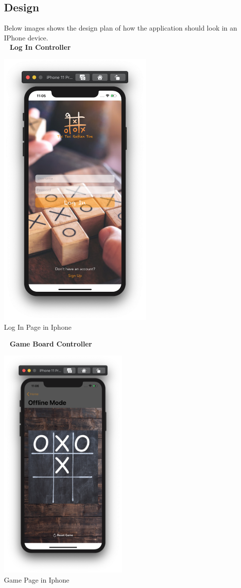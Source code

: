 \documentclass{scrartcl}
\begin{document}
    \subsection{Design}
        Below images shows the design plan of how the application should look in an IPhone device.\\
        ~\newline
        \textbf{Log In Controller}
        \begin{center}
        \includegraphics[width=3in]{images/login.png}\\
        \caption{Log In Page in Iphone}
        \end{center}
        ~\newpage
        \textbf{Game Board Controller}
        \begin{center}
        \includegraphics[width=2.5in]{images/board.png}\\
        \caption{Game Page in Iphone}
        \end{center}
        
\end{document}
